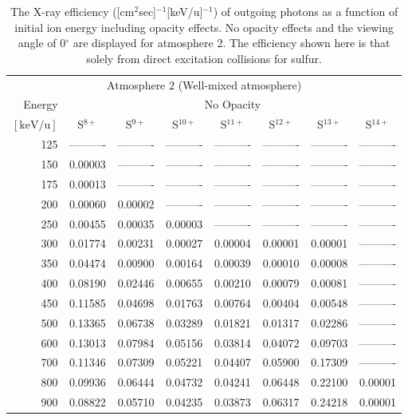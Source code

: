 \begin{table}[ht]
    \centering
    \caption{The X-ray efficiency ([cm$^2$sec]$^{-1}$[keV/u]$^{-1}$) of outgoing photons as a function of initial ion energy including opacity effects. No opacity effects and the viewing angle of 0$^\circ$ are displayed for atmosphere 2. The efficiency shown here is that solely from direct excitation collisions for sulfur.}
    \begin{tabular}{r|c|c|c|c|c|c|c}
    \multicolumn{8}{c}{Atmosphere 2 (Well-mixed atmosphere)} \\ \cline{2-8}
    Energy & \multicolumn{7}{c}{No Opacity} \\ \cline{2-8}
    $\mathrm{[keV/u]}$ & S$^{8+}$ & S$^{9+}$ & S$^{10+}$ & S$^{11+}$ & S$^{12+}$ & S$^{13+}$ & S$^{14+}$ \\ \cline{1-8}
      125 & ---------- & ---------- & ---------- & ---------- & ---------- & ---------- & ---------- \\ 
      150 & 0.00003 & ---------- & ---------- & ---------- & ---------- & ---------- & ---------- \\
      175 & 0.00013 & ---------- & ---------- & ---------- & ---------- & ---------- & ---------- \\
      200 & 0.00060 & 0.00002 & ---------- & ---------- & ---------- & ---------- & ---------- \\
      250 & 0.00455 & 0.00035 & 0.00003 & ---------- & ---------- & ---------- & ---------- \\
      300 & 0.01774 & 0.00231 & 0.00027 & 0.00004 & 0.00001 & 0.00001 & ---------- \\
      350 & 0.04474 & 0.00900 & 0.00164 & 0.00039 & 0.00010 & 0.00008 & ---------- \\
      400 & 0.08190 & 0.02446 & 0.00655 & 0.00210 & 0.00079 & 0.00081 & ---------- \\
      450 & 0.11585 & 0.04698 & 0.01763 & 0.00764 & 0.00404 & 0.00548 & ---------- \\
      500 & 0.13365 & 0.06738 & 0.03289 & 0.01821 & 0.01317 & 0.02286 & ---------- \\
      600 & 0.13013 & 0.07984 & 0.05156 & 0.03814 & 0.04072 & 0.09703 & ---------- \\
      700 & 0.11346 & 0.07309 & 0.05221 & 0.04407 & 0.05900 & 0.17309 & ---------- \\
      800 & 0.09936 & 0.06444 & 0.04732 & 0.04241 & 0.06448 & 0.22100 & 0.00001 \\
      900 & 0.08822 & 0.05710 & 0.04235 & 0.03873 & 0.06317 & 0.24218 & 0.00001 \\

\end{tabular}
\end{table}
